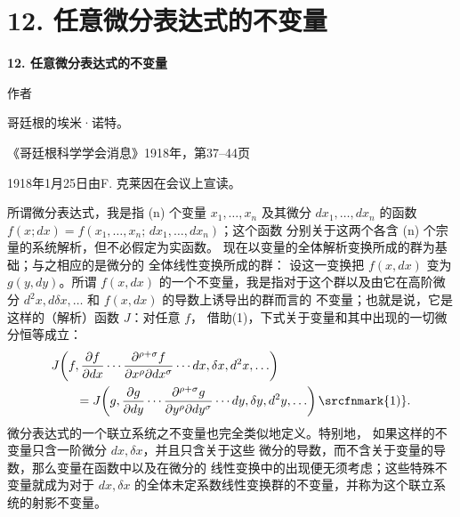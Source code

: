 \section*{12. 任意微分表达式的不变量}
\begin{center}
{\Large\bfseries 12. 任意微分表达式的不变量}\par
\vspace{0.8em}
作者\par
\vspace{0.8em}
哥廷根的埃米·诺特。\par
\vspace{1.5em}
《哥廷根科学学会消息》1918年，第37--44页
\end{center}

\vspace{3em}
\begin{center}
1918年1月25日由F. 克莱因在会议上宣读。
\end{center}

所谓微分表达式，我是指 (n) 个变量
\(x_1,\ldots,x_n\) 及其微分
\(dx_1,\ldots,dx_n\) 的函数
\(f(x;dx)=f(x_1,\ldots,x_n;\,dx_1,\ldots,dx_n)\)；这个函数
分别关于这两个各含 (n) 个宗量的系统解析，但不必假定为实函数。
现在以变量的全体解析变换所成的群为基础；与之相应的是微分的
全体线性变换所成的群：
设这一变换把 \(f(x,dx)\) 变为 \(g(y,dy)\)。所谓
\(f(x,dx)\) 的一个不变量，我是指对于这个群以及由它在高阶微分
\(d^2x,d\delta x,\ldots\) 和 \(f(x,dx)\) 的导数上诱导出的群而言的
不变量；也就是说，它是这样的（解析）函数 \(J\)：对任意 \(f\)，
借助(1)，下式关于变量和其中出现的一切微分恒等成立：
\[
\begin{aligned}
&J\!\left(f,\frac{\partial f}{\partial dx}\cdots
\frac{\partial^{\rho+\sigma}f}{\partial x^\rho\partial dx^\sigma}
\cdots dx,\delta x,d^2x,\ldots\right)\\
&\qquad =
J\!\left(g,\frac{\partial g}{\partial dy}\cdots
\frac{\partial^{\rho+\sigma}g}{\partial y^\rho\partial dy^\sigma}
\cdots dy,\delta y,d^2y,\ldots\right)\srcfnmark{1)}.
\end{aligned}
\]
微分表达式的一个联立系统之不变量也完全类似地定义。特别地，
如果这样的不变量只含一阶微分 \(dx,\delta x\)，并且只含关于这些
微分的导数，而不含关于变量的导数，那么变量在函数中以及在微分的
线性变换中的出现便无须考虑；这些特殊不变量就成为对于 \(dx,\delta x\)
的全体未定系数线性变换群的不变量，并称为这个联立系统的射影不变量。

